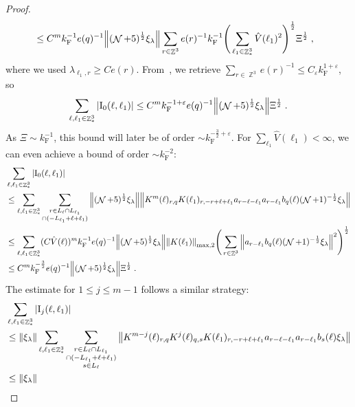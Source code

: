 \documentclass[12pt,a4paper]{article}
\numberwithin{equation}{section}
\newcommand{\1}{\mathbb{I}}
\newcommand{\F}{\mathrm{F}}
\newcommand{\I}{\mathrm{I}}
\DeclareMathOperator{\Z}{\mathbb{Z}}
\DeclareMathOperator{\NN}{\mathcal{N}}
\newcommand{\half}{\frac{1}{2}}
\theoremstyle{plain}
\theoremstyle{definition}
\theoremstyle{remark}
\theoremstyle{plain}
\theoremstyle{definition}
\theoremstyle{remark}
\begin{document}
\begin{proof}
{\begin{align}
	 &\leq C^m k_{\F}^{-1} e(q)^{-1}
	 	\norm{ (\NN+5)^{\half} \xi_\lambda}
	 	\sum_{r \in \Z^3} e(r)^{-1} k_{\F}^{-1} \Bigg( \sum_{\ell_1 \in \Z^3_*} \hat{V}(\ell_1)^2 \Bigg)^{\half} \Xi^\half \;,
\end{align}
where we used $ \lambda_{\ell_1,r} \ge C e(r) $. From~\cite[Lemma~3.2]{CHN24}, we retrieve $ \sum_{r \in \Z^3} e(r)^{-1} \le C_\varepsilon k_{\F}^{1+\varepsilon} $, so
\begin{align}
	\sum_{\ell,\ell_1 \in \Z^3_*} |\I_0(\ell, \ell_1)|
	\leq C^m k_{\F}^{-1+\varepsilon} e(q)^{-1}
	 	\norm{ (\NN+5)^{\half} \xi_\lambda}
	 	\Xi^{\half}	\;.
	\label{eq:estEQ1121}
\end{align}
As $ \Xi \sim k_{\F}^{-1} $, this bound will later be of order $ \sim k_{\F}^{-\frac 32 + \varepsilon} $. For $ \sum_{\ell_1} \hat{V}(\ell_1) < \infty $, we can even achieve a bound of order $ \sim k_{\F}^{-2} $:
\begin{align}
	&\sum_{\ell,\ell_1 \in \Z^3_*} |\I_0(\ell, \ell_1)| \nonumber\\
	&\leq \sum_{\ell,\ell_1 \in \Z^3_*} \sum\limits_{\substack{r\in L_{\ell} \cap L_{\ell_1}\\ \cap (-L_{\ell_1}+\ell+\ell_1)}} \norm{ (\NN+5)^{\half} \xi_\lambda} \norm{ K^m(\ell )_{r,q} K(\ell_1)_{r,-r+\ell+\ell_1} a_{r-\ell-\ell_1} a_{r-\ell_1} b_{q}(\ell) (\NN+1)^{-\half} \xi_\lambda }\nonumber\\
	 &\leq \sum_{\ell,\ell_1 \in \Z^3_*} (C \hat{V}(\ell))^m k_{\F}^{-1} e(q)^{-1}
	 	\norm{ (\NN+5)^{\half} \xi_\lambda} \norm{K(\ell_1) }_{\max,2}
	 	\Bigg( \sum\limits_{r\in \Z^3} \norm{ a_{r-\ell_1} b_{q}(\ell) (\NN+1)^{-\half} \xi_\lambda }^2 \Bigg)^\half \nonumber\\
	 &\leq C^m
	 	k_{\F}^{-\frac 32} e(q)^{-1}
	 	\norm{(\NN+5)^{\half} \xi_\lambda}
	 	\Xi^{\half} \;.
\end{align}
}
The estimate for $ 1 \le j \le m-1 $ follows a similar strategy:
\textcolor{green!30!black}{
\begin{align}
	&\sum_{\ell,\ell_1 \in \Z^3_*} |\I_j(\ell, \ell_1)| \nonumber\\
	&\leq \norm{ \xi_\lambda} \sum_{\ell,\ell_1 \in \Z^3_*} \sum\limits_{\substack{r\in L_{\ell} \cap L_{\ell_1} \\ \cap (-L_{\ell_1} + \ell + \ell_1)\\s\in L_{\ell}}}
		\norm{K^{m-j}(\ell)_{r,q} K^j(\ell)_{q,s} K(\ell_1)_{r,-r+\ell+\ell_1} a_{r-\ell-\ell_1} a_{r-\ell_1} b_{s}(\ell) \xi_\lambda }\nonumber\\
	&\leq \norm{ \xi_\lambda} 

\end{align}}
\end{proof}
\end{document}
